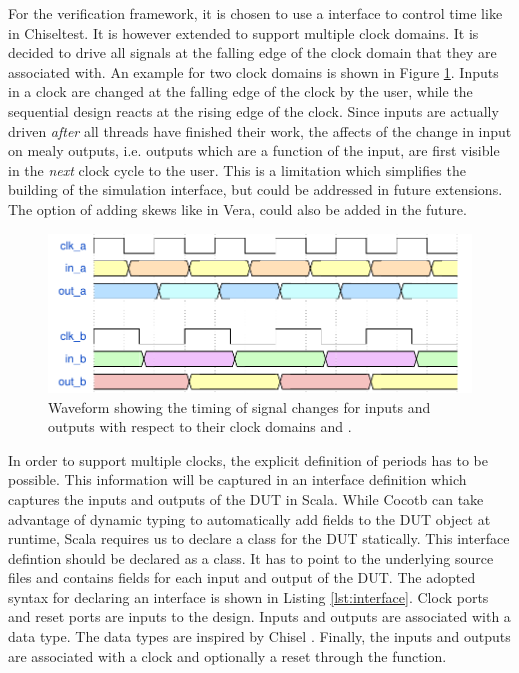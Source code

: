 For the verification framework, it is chosen to use a  interface to control time like in Chiseltest. It is
however extended to support multiple clock domains. It is decided to drive all signals at the falling edge of the
clock domain that they are associated with. An example for two clock domains is shown in Figure \ref{fig:wavedrom}. Inputs in a clock are changed at the falling edge of the clock by the user, while the sequential design reacts at the rising edge of the clock. Since inputs are actually driven \textit{after} all threads have finished their work, the affects of the change in input on mealy outputs, i.e. outputs which are a function of the input, are first visible in the \textit{next} clock cycle to the user. This is a limitation which simplifies the building of the simulation interface, but could be addressed in future extensions. The option of adding skews like in Vera, could also be added in the future. 
\begin{figure}
\centering
\includegraphics[width=\textwidth]{diagrams/wavedrom.pdf}
\caption{Waveform showing the timing of signal changes for inputs and outputs with respect to their clock domains  and .}
\label{fig:wavedrom}
\end{figure}

In order to support multiple clocks, the explicit definition of periods has to be possible. This information will be captured in an interface definition which captures the inputs and outputs of the DUT in
Scala. While Cocotb can take advantage of dynamic typing to automatically add fields to the DUT object at runtime,
Scala requires us to declare a class for the DUT statically. This interface defintion should be declared as a class.
It has to point to the underlying source files and contains fields for each input and output of the DUT. The adopted
syntax for declaring an interface is shown in Listing \ref{lst:interface}. Clock ports and reset ports are inputs to
the design. Inputs and outputs are associated with a data type. The data types are inspired by Chisel
\cite{chiselpaper}. Finally, the inputs and outputs are associated with a clock and optionally a reset through the
 function.


